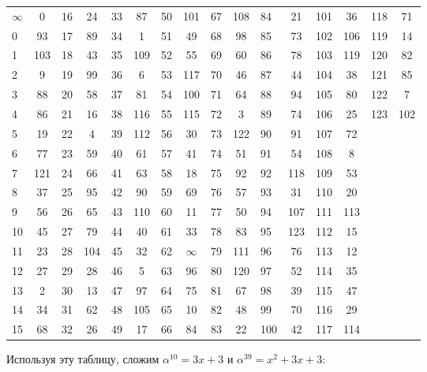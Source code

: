 \documentclass[a4paper,14pt]{extarticle}
\begin{document}
	\noindent\begin{minipage}{1.0\linewidth}
		\centering
		\fontsize{12pt}{10pt}\selectfont
		\begin{tabular}{|a c| a c| a c| a c| a c| a c| a c| a c |}
			$\infty$ & 0 & 16 & 24 & 33 & 87 & 50 & 101 & 67 & 108 & 84 & 21 & 101 & 36 & 118 & 71 \\
			0 & 93 & 17 & 89 & 34 & 1 & 51 & 49 & 68 & 98 & 85 & 73 & 102 & 106 & 119 & 14 \\
			1 & 103 & 18 & 43 & 35 & 109 & 52 & 55 & 69 & 60 & 86 & 78 & 103 & 119 & 120 & 82 \\
			2 & 9 & 19 & 99 & 36 & 6 & 53 & 117 & 70 & 46 & 87 & 44 & 104 & 38 & 121 & 85 \\
			3 & 88 & 20 & 58 & 37 & 81 & 54 & 100 & 71 & 64 & 88 & 94 & 105 & 80 & 122 & 7 \\
			4 & 86 & 21 & 16 & 38 & 116 & 55 & 115 & 72 & 3 & 89 & 74 & 106 & 25 & 123 & 102 \\
			5 & 19 & 22 & 4 & 39 & 112 & 56 & 30 & 73 & 122 & 90 & 91 & 107 & 72 & & \\
			6 & 77 & 23 & 59 & 40 & 61 & 57 & 41 & 74 & 51 & 91 & 54 & 108 & 8 & & \\
			7 & 121 & 24 & 66 & 41 & 63 & 58 & 18 & 75 & 92 & 92 & 118 & 109 & 53  & & \\
			8 & 37 & 25 & 95 & 42 & 90 & 59 & 69 & 76 & 57 & 93 & 31 & 110 & 20  & & \\
			9 & 56 & 26 & 65 & 43 & 110 & 60 & 11 & 77 & 50 & 94 & 107 & 111 & 113  & & \\
			10 & 45 & 27 & 79 & 44 & 40 & 61 & 33 & 78 & 83 & 95 & 123 & 112 & 15  & & \\
			11 & 23 & 28 & 104 & 45 & 32 & 62 & $\infty$ & 79 & 111 & 96 & 76 & 113 & 12  & & \\
			12 & 27 & 29 & 28 & 46 & 5 & 63 & 96 & 80 & 120 & 97 & 52 & 114 & 35  & & \\
			13 & 2 & 30 & 13 & 47 & 97 & 64 & 75 & 81 & 67 & 98 & 39 & 115 & 47  & & \\
			14 & 34 & 31 & 62 & 48 & 105 & 65 & 10 & 82 & 48 & 99 & 70 & 116 & 29  & & \\
			15 & 68 & 32 & 26 & 49 & 17 & 66 & 84 & 83 & 22 & 100 & 42 & 117 & 114 & &
		\end{tabular}
	\end{minipage}
	\newline
	
	Используя эту таблицу, сложим $\alpha^{10} = 3x+3$ и $\alpha^{39} = x^2+3x+3$:
	
\end{document}
